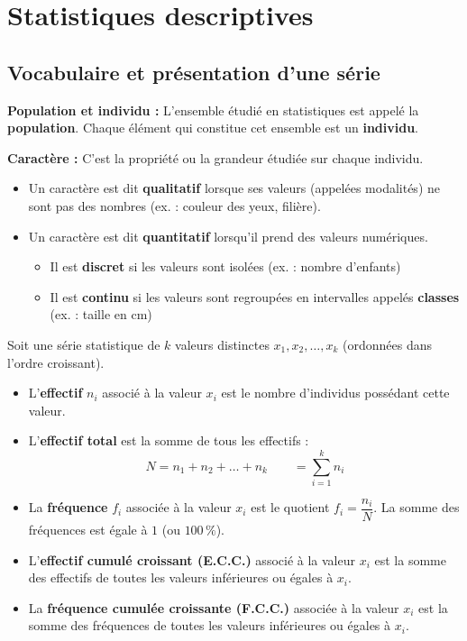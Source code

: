 \chapter{Statistiques descriptives}

\section{Vocabulaire et présentation d'une série}

\begin{defin}
	\textbf{Population et individu :} L'ensemble étudié en statistiques est appelé la \textbf{population}. Chaque élément qui constitue cet ensemble est un \textbf{individu}.

	\textbf{Caractère :} C'est la propriété ou la grandeur étudiée sur chaque individu.
	\begin{itemize}
		\item Un caractère est dit \textbf{qualitatif} lorsque ses valeurs (appelées modalités) ne sont pas des nombres (ex. : couleur des yeux, filière).
		\item Un caractère est dit \textbf{quantitatif} lorsqu'il prend des valeurs numériques.
		      \begin{itemize}
			      \item Il est \textbf{discret} si les valeurs sont \og{}isolées\fg{} (ex. : nombre d'enfants)
			      \item Il est \textbf{continu} si les valeurs sont regroupées en intervalles appelés \textbf{classes} (ex. : taille en $\text{cm}$)
		      \end{itemize}
	\end{itemize}
\end{defin}

\begin{defin}
	Soit une série statistique de $k$ valeurs distinctes $x_1, x_2, \dots, x_k$ (ordonnées dans l'ordre croissant).
	\begin{itemize}
		\item L'\textbf{effectif} $n_i$ associé à la valeur $x_i$ est le nombre d'individus possédant cette valeur.
		\item L'\textbf{effectif total} est la somme de tous les effectifs :
		      \[
			      N = n_1 + n_2 + \dots + n_k \qquad = \displaystyle\sum_{i=1}^k n_i
		      \]
		\item La \textbf{fréquence} $f_i$ associée à la valeur $x_i$ est le quotient $f_i = \dfrac{n_i}{N}$. La somme des fréquences est égale à $1$ (ou $100\,\%$).
		\item L'\textbf{effectif cumulé croissant (E.C.C.)} associé à la valeur $x_i$ est la somme des effectifs de toutes les valeurs inférieures ou égales à $x_i$.
		\item La \textbf{fréquence cumulée croissante (F.C.C.)} associée à la valeur $x_i$ est la somme des fréquences de toutes les valeurs inférieures ou égales à $x_i$.
	\end{itemize}
\end{defin}

